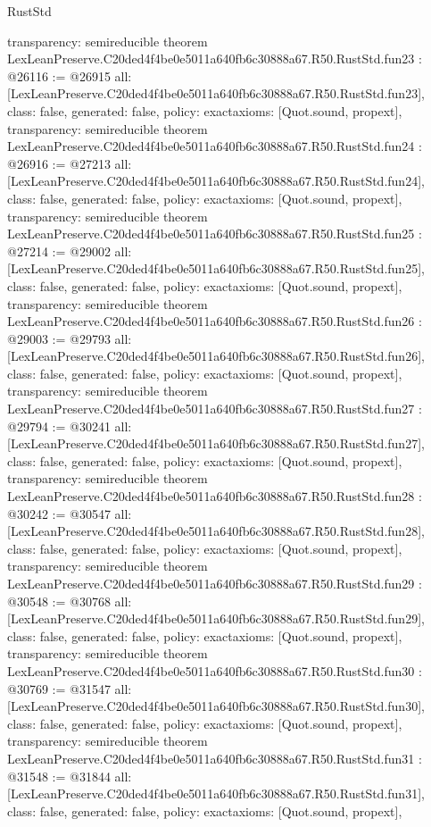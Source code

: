 \begin{lexlean}{RustStd}
\begin{coremodule}
{  transparency: semireducible
}
theorem LexLeanPreserve.C20ded4f4be0e5011a640fb6c30888a67.R50.RustStd.fun23 : @26116 := @26915 {
  all: [LexLeanPreserve.C20ded4f4be0e5011a640fb6c30888a67.R50.RustStd.fun23],
  class: false,
  generated: false,
  policy: exact{axioms: [Quot.sound, propext]},
  transparency: semireducible
}
theorem LexLeanPreserve.C20ded4f4be0e5011a640fb6c30888a67.R50.RustStd.fun24 : @26916 := @27213 {
  all: [LexLeanPreserve.C20ded4f4be0e5011a640fb6c30888a67.R50.RustStd.fun24],
  class: false,
  generated: false,
  policy: exact{axioms: [Quot.sound, propext]},
  transparency: semireducible
}
theorem LexLeanPreserve.C20ded4f4be0e5011a640fb6c30888a67.R50.RustStd.fun25 : @27214 := @29002 {
  all: [LexLeanPreserve.C20ded4f4be0e5011a640fb6c30888a67.R50.RustStd.fun25],
  class: false,
  generated: false,
  policy: exact{axioms: [Quot.sound, propext]},
  transparency: semireducible
}
theorem LexLeanPreserve.C20ded4f4be0e5011a640fb6c30888a67.R50.RustStd.fun26 : @29003 := @29793 {
  all: [LexLeanPreserve.C20ded4f4be0e5011a640fb6c30888a67.R50.RustStd.fun26],
  class: false,
  generated: false,
  policy: exact{axioms: [Quot.sound, propext]},
  transparency: semireducible
}
theorem LexLeanPreserve.C20ded4f4be0e5011a640fb6c30888a67.R50.RustStd.fun27 : @29794 := @30241 {
  all: [LexLeanPreserve.C20ded4f4be0e5011a640fb6c30888a67.R50.RustStd.fun27],
  class: false,
  generated: false,
  policy: exact{axioms: [Quot.sound, propext]},
  transparency: semireducible
}
theorem LexLeanPreserve.C20ded4f4be0e5011a640fb6c30888a67.R50.RustStd.fun28 : @30242 := @30547 {
  all: [LexLeanPreserve.C20ded4f4be0e5011a640fb6c30888a67.R50.RustStd.fun28],
  class: false,
  generated: false,
  policy: exact{axioms: [Quot.sound, propext]},
  transparency: semireducible
}
theorem LexLeanPreserve.C20ded4f4be0e5011a640fb6c30888a67.R50.RustStd.fun29 : @30548 := @30768 {
  all: [LexLeanPreserve.C20ded4f4be0e5011a640fb6c30888a67.R50.RustStd.fun29],
  class: false,
  generated: false,
  policy: exact{axioms: [Quot.sound, propext]},
  transparency: semireducible
}
theorem LexLeanPreserve.C20ded4f4be0e5011a640fb6c30888a67.R50.RustStd.fun30 : @30769 := @31547 {
  all: [LexLeanPreserve.C20ded4f4be0e5011a640fb6c30888a67.R50.RustStd.fun30],
  class: false,
  generated: false,
  policy: exact{axioms: [Quot.sound, propext]},
  transparency: semireducible
}
theorem LexLeanPreserve.C20ded4f4be0e5011a640fb6c30888a67.R50.RustStd.fun31 : @31548 := @31844 {
  all: [LexLeanPreserve.C20ded4f4be0e5011a640fb6c30888a67.R50.RustStd.fun31],
  class: false,
  generated: false,
  policy: exact{axioms: [Quot.sound, propext]},
}
\end{coremodule}
\end{lexlean}
